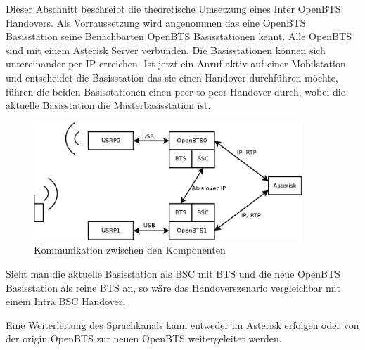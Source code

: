 \label{sec:interbts}

Dieser Abschnitt beschreibt die theoretische Umsetzung eines Inter OpenBTS Hand\-overs. Als Vorraussetzung wird angenommen das eine OpenBTS Basisstation seine Benachbarten OpenBTS Basisstationen kennt. Alle OpenBTS sind mit einem Asterisk Server verbunden. Die Basisstationen können sich untereinander per IP erreichen. Ist jetzt ein Anruf aktiv auf einer Mobilstation und entscheidet die Basisstation das sie einen Handover durchführen möchte, führen die beiden Basisstationen einen peer-to-peer Handover durch, wobei die aktuelle Basisstation die Masterbasisstation ist.

\begin{figure}[htbp]
	\centering
		\includegraphics[width=0.9\textwidth]{img/inter_openbts}
	\caption{Kommunikation zwischen den Komponenten}
	\label{fig:interopenbts_komm}
\end{figure}

Sieht man die aktuelle Basisstation als BSC mit BTS und die neue OpenBTS Basisstation als reine BTS an, so wäre das Handoverszenario vergleichbar mit einem Intra BSC Handover.

Eine Weiterleitung des Sprachkanals kann entweder im Asterisk erfolgen oder von der origin OpenBTS zur neuen OpenBTS weitergeleitet werden. 
